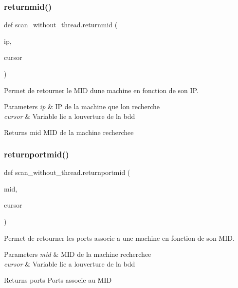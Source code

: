\subsubsection{\texorpdfstring{returnmid()}{returnmid()}}
{\footnotesize\ttfamily def scan\+\_\+without\+\_\+thread.\+returnmid (\begin{DoxyParamCaption}\item[{}]{ip,  }\item[{}]{cursor }\end{DoxyParamCaption})}



Permet de retourner le M\+ID d\textquotesingle{}une machine en fonction de son IP. 


\begin{DoxyParams}{Parameters}
{\em ip} & IP de la machine que l\textquotesingle{}on recherche \\
\hline
{\em cursor} & Variable lie a l\textquotesingle{}ouverture de la bdd \\
\hline
\end{DoxyParams}
\begin{DoxyReturn}{Returns}
mid M\+ID de la machine recherchee 
\end{DoxyReturn}
\hypertarget{namespacescan__without__thread_a10fe610293f37448f5ec2c055c2d8bef}{}\label{namespacescan__without__thread_a10fe610293f37448f5ec2c055c2d8bef} 
\subsubsection{\texorpdfstring{returnportmid()}{returnportmid()}}
{\footnotesize\ttfamily def scan\+\_\+without\+\_\+thread.\+returnportmid (\begin{DoxyParamCaption}\item[{}]{mid,  }\item[{}]{cursor }\end{DoxyParamCaption})}



Permet de retourner les ports associe a une machine en fonction de son M\+ID. 


\begin{DoxyParams}{Parameters}
{\em mid} & M\+ID de la machine recherchee \\
\hline
{\em cursor} & Variable lie a l\textquotesingle{}ouverture de la bdd \\
\hline
\end{DoxyParams}
\begin{DoxyReturn}{Returns}
ports Ports associe au M\+ID 
\end{DoxyReturn}
\hypertarget{namespacescan__without__thread_adc066120369e8f9d516e17220da6cdcf}{}\label{namespacescan__without__thread_adc066120369e8f9d516e17220da6cdcf} 
